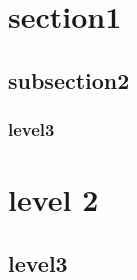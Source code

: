 \documentclass[10pt,a4paper]{article}
\begin{document}
\section{section1}
\subsection{subsection2}
\subsubsection{level3}
\section{level 2}
\subsection{level3}
\end{document}
